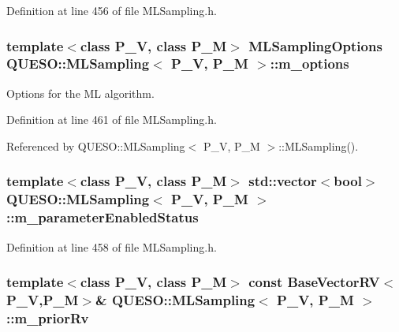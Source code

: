 Definition at line 456 of file M\-L\-Sampling.\-h.

\hypertarget{class_q_u_e_s_o_1_1_m_l_sampling_af8504cc57ec72b3c52833826b2bfff8e}{
\subsubsection[{m\-\_\-options}]{\setlength{\rightskip}{0pt plus 5cm}template$<$class P\-\_\-\-V, class P\-\_\-\-M$>$ {\bf M\-L\-Sampling\-Options} {\bf Q\-U\-E\-S\-O\-::\-M\-L\-Sampling}$<$ P\-\_\-\-V, P\-\_\-\-M $>$\-::m\-\_\-options\hspace{0.3cm}{\ttfamily [private]}}}\label{class_q_u_e_s_o_1_1_m_l_sampling_af8504cc57ec72b3c52833826b2bfff8e}


Options for the M\-L algorithm. 



Definition at line 461 of file M\-L\-Sampling.\-h.



Referenced by Q\-U\-E\-S\-O\-::\-M\-L\-Sampling$<$ P\-\_\-\-V, P\-\_\-\-M $>$\-::\-M\-L\-Sampling().

\hypertarget{class_q_u_e_s_o_1_1_m_l_sampling_ac76690384f70d74b8662faf7a051449e}{
\subsubsection[{m\-\_\-parameter\-Enabled\-Status}]{\setlength{\rightskip}{0pt plus 5cm}template$<$class P\-\_\-\-V, class P\-\_\-\-M$>$ std\-::vector$<$bool$>$ {\bf Q\-U\-E\-S\-O\-::\-M\-L\-Sampling}$<$ P\-\_\-\-V, P\-\_\-\-M $>$\-::m\-\_\-parameter\-Enabled\-Status\hspace{0.3cm}{\ttfamily [private]}}}\label{class_q_u_e_s_o_1_1_m_l_sampling_ac76690384f70d74b8662faf7a051449e}


Definition at line 458 of file M\-L\-Sampling.\-h.

\hypertarget{class_q_u_e_s_o_1_1_m_l_sampling_aa45e9c06bd51cae0dc2294af1831c158}{
\subsubsection[{m\-\_\-prior\-Rv}]{\setlength{\rightskip}{0pt plus 5cm}template$<$class P\-\_\-\-V, class P\-\_\-\-M$>$ const {\bf Base\-Vector\-R\-V}$<$P\-\_\-\-V,P\-\_\-\-M$>$\& {\bf Q\-U\-E\-S\-O\-::\-M\-L\-Sampling}$<$ P\-\_\-\-V, P\-\_\-\-M $>$\-::m\-\_\-prior\-Rv\hspace{0.3cm}{\ttfamily [private]}}}\label{class_q_u_e_s_o_1_1_m_l_sampling_aa45e9c06bd51cae0dc2294af1831c158}


